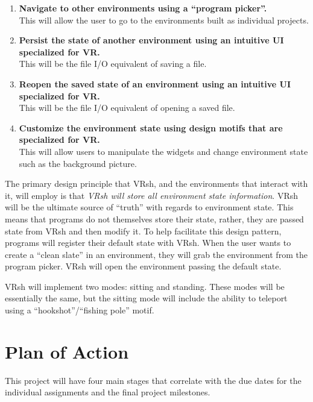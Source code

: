\documentclass[titlepage,12pt]{article}
\begin{document}
\begin{enumerate}
    \item \textbf{Navigate to other environments using a ``program picker''.}\\
        This will allow the user to go to the environments built as individual
        projects.

    \item \textbf{Persist the state of another environment using an intuitive UI
        specialized for VR.} \\
        This will be the file I/O equivalent of saving a file.

    \item \textbf{Reopen the saved state of an environment using an intuitive UI
        specialized for VR.} \\
        This will be the file I/O equivalent of opening a saved file.

    \item \textbf{Customize the environment state using design motifs that are
        specialized for VR.} \\
        This will allow users to manipulate the widgets and change environment
        state such as the background picture.
\end{enumerate}

The primary design principle that VRsh, and the environments that interact with
it, will employ is that \textit{VRsh will store all environment state
information}. VRsh will be the ultimate source of ``truth'' with regards to
environment state. This means that programs do not themselves store their state,
rather, they are passed state from VRsh and then modify it. To help facilitate
this design pattern, programs will register their default state with VRsh.
When the user wants to create a ``clean slate'' in an environment, they will
grab the environment from the program picker. VRsh will open the environment
passing the default state.

VRsh will implement two modes: sitting and standing. These modes will be
essentially the same, but the sitting mode will include the ability to teleport
using a ``hookshot''/``fishing pole'' motif.

\section{Plan of Action}

This project will have four main stages that correlate with the due dates for
the individual assignments and the final project milestones.
\end{document}
